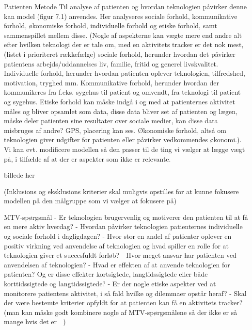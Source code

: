 Patienten
Metode
Til analyse af patienten og hvordan teknologien påvirker denne kan model (figur 7.1) anvendes. Her analyseres sociale forhold, kommunikative forhold, økonomiske forhold, individuelle forhold og etiske forhold, samt sammenspillet mellem disse. (Nogle af aspekterne kan vægte mere end andre alt efter hvilken teknologi der er tale om, med en aktivitets tracker er det nok mest, (listet i prioriteret rækkefælge) sociale forhold, herunder hvordan det påvirker patientens arbejds/uddannelses liv, familie, fritid og generel livskvalitet. Individuelle forhold, herunder hvordan patienten oplever teknologien, tilfredshed, motivation, tryghed mm. Kommunikative forhold, herunder hvordan der kommunikeres fra f.eks. sygehus til patient og omvendt, fra teknologi til patient og sygehus. Etiske forhold kan måske indgå i og med at patienternes aktivitet måles og bliver opsamlet som data, disse data bliver set af patienten og lægen, måske deler patienten sine resultater over sociale medier, kan disse data misbruges af andre? GPS, placering kan ses. Økonomiske forhold, altså om teknologien giver udgifter for patienten eller påvirker vedkommendes økonomi.).
Vi kan evt. modificere modellen så den passer til de ting vi vælger at lægge vægt på, i tilfælde af at der er aspekter som ikke er relevante. 


billede her

(Inklusions og eksklusions kriterier skal muligvis opstilles for at kunne fokusere modellen på den målgruppe som vi vælger at fokusere på)


MTV-spørgsmål
-	Er teknologien brugervenlig og motiverer den patienten til at få en mere aktiv hverdag?
-	Hvordan påvirker teknologien patienternes individuelle og sociale forhold i dagligdagen?
-	Hvor stor en andel af patienter oplever en positiv virkning ved anvendelse af teknologien og hvad spiller en rolle for at teknologien giver et succesfuldt forløb?
-	Hvor meget ansvar har patienten ved anvendelsen af teknologien?
-	Hvad er effekten af at anvende teknologien for patienten? Og er disse effekter kortsigtede, langtidssigtede eller både korttidssigtede og langtidssigtede?
-	Er der nogle etiske aspekter ved at monitorere patientens aktivitet, i så fald hvilke og dilemmaer opstår heraf?
-	Skal der være bestemte kriterier opfyldt for at patienten kan få en aktivitets tracker?
(man kan måske godt kombinere nogle af MTV-spørgsmålene så der ikke er så mange hvis det er  ) 
